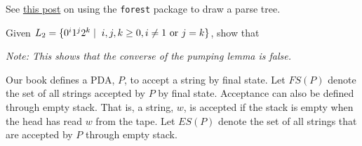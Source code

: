 \documentclass[addpoints]{exam}
\begin{document}
\begin{questions}
  See \href{https://tex.stackexchange.com/a/214657/44301}{this post} on using the \texttt{forest} package to draw a parse tree.

\question Given $L_2 = \{0^i1^j2^k \mid \hspace{1mm} i,j,k \geq 0, i \neq 1 \text{ or } j = k\}$, show that 
  \textit{Note: This shows that the converse of the pumping lemma is false.}
  
\question Our book defines a PDA, $P$, to accept a string by final state. Let $FS(P)$ denote the set of all strings accepted by $P$ by final state. Acceptance can also be defined through empty stack. That is, a string, $w$, is accepted if the stack is empty when the head has read $w$ from the tape. Let $ES(P)$ denote the set of all strings that are accepted by $P$ through empty stack.
  \begin{parts}

\end{parts}
\end{questions}
\end{document}
